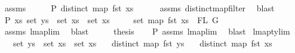 \begin{isabellebody}
\ assms\isanewline
{}\isamarkupfalse%
\ {\isacharminus}{\kern0pt}\isanewline
\ \ \isamarkupfalse%
\ P{}{\isacharcolon}{\kern0pt}\ {\isachardoublequoteopen}distinct\ {\isacharparenleft}{\kern0pt}map\ fst\ xs{\isacharparenright}{\kern0pt}{\isachardoublequoteclose}\isanewline
\ \ \ \ \isamarkupfalse%
\ assms{\isacharparenleft}{\kern0pt}{}{\isacharcomma}{\kern0pt}{}{\isacharparenright}{\kern0pt}\ distinct{\isacharunderscore}{\kern0pt}map{\isacharunderscore}{\kern0pt}filter\ \isamarkupfalse%
\ blast\isanewline
\ \ \isamarkupfalse%
\ P{}{\isacharcolon}{\kern0pt}\ {\isachardoublequoteopen}{\isasymexists}xs{}{\isachardot}{\kern0pt}\ {\isacharparenleft}{\kern0pt}set\ ys\ {\isacharequal}{\kern0pt}\ set\ xs{}\ {\isasymunion}\ set\ xs\isanewline
\ \ \ \ {\isasymand}\ set\ {\isacharparenleft}{\kern0pt}map\ fst\ xs{}{\isacharparenright}{\kern0pt}\ {\isasyminter}\ FL\ G\ {\isacharequal}{\kern0pt}\ {\isacharbraceleft}{\kern0pt}{\isacharbraceright}{\kern0pt}{\isacharparenright}{\kern0pt}{\isachardoublequoteclose}\isanewline
\ \ \ \isamarkupfalse%
\ assms{\isacharparenleft}{\kern0pt}{}{\isacharparenright}{\kern0pt}\ lmap{\isacharunderscore}{\kern0pt}lim{}\ \isamarkupfalse%
\ blast\isanewline
\ \ \isamarkupfalse%
\ \isamarkupfalse%
\ {\isacharquery}{\kern0pt}thesis\isanewline
\ \ \isamarkupfalse%
\ P{}\ assms{\isacharparenleft}{\kern0pt}{}{\isacharparenright}{\kern0pt}\ lmap{\isacharunderscore}{\kern0pt}lim{}\ \isamarkupfalse%
\ blast\isanewline
{}\isamarkupfalse%
%
\endisatagproof
{\isafoldproof}%
%
\isadelimproof
\isanewline
%
\endisadelimproof
\isanewline
\isanewline
{}\isamarkupfalse%
\ lmap{\isacharunderscore}{\kern0pt}ty{\isacharunderscore}{\kern0pt}lim{}{\isacharcolon}{\kern0pt}\isanewline
\ \ \ {\isachardoublequoteopen}set\ ys\ {\isacharequal}{\kern0pt}\ set\ xs{}\ {\isasymunion}\ set\ xs{}{\isachardoublequoteclose}\isanewline
\ \ \ {\isachardoublequoteopen}distinct\ {\isacharparenleft}{\kern0pt}map\ fst\ ys{\isacharparenright}{\kern0pt}{\isachardoublequoteclose}\isanewline
\ \ \ {\isachardoublequoteopen}distinct\ {\isacharparenleft}{\kern0pt}map\ fst\ xs{}{\isacharparenright}{\kern0pt}{\isachardoublequoteclose}\isanewline

\end{isabellebody}
